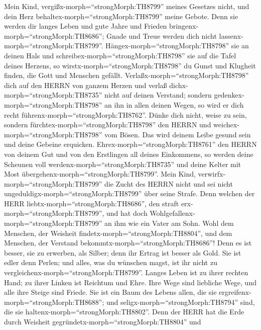  Mein Kind, vergißx-morph=``strongMorph:TH8799'' meines
Gesetzes nicht, und dein Herz behaltex-morph=``strongMorph:TH8799''
meine Gebote.  Denn sie werden dir langes Leben und gute
Jahre und Frieden bringenx-morph=``strongMorph:TH8686''; 
Gnade und Treue werden dich nicht lassenx-morph=``strongMorph:TH8799''.
Hängex-morph=``strongMorph:TH8798'' sie an deinen Hals und
schreibex-morph=``strongMorph:TH8798'' sie auf die Tafel deines Herzens,
 so wirstx-morph=``strongMorph:TH8798'' du Gunst und
Klugheit finden, die Gott und Menschen gefällt. 
Verlaßx-morph=``strongMorph:TH8798'' dich auf den HERRN von ganzem
Herzen und verlaß dichx-morph=``strongMorph:TH8735'' nicht auf deinen
Verstand;  sondern gedenkex-morph=``strongMorph:TH8798'' an
ihn in allen deinen Wegen, so wird er dich recht
führenx-morph=``strongMorph:TH8762''.  Dünke dich nicht,
weise zu sein, sondern fürchtex-morph=``strongMorph:TH8798'' den HERRN
und weichex-morph=``strongMorph:TH8798'' vom Bösen.  Das
wird deinem Leibe gesund sein und deine Gebeine erquicken. 
Ehrex-morph=``strongMorph:TH8761'' den HERRN von deinem Gut und von den
Erstlingen all deines Einkommens,  so werden deine Scheunen
voll werdenx-morph=``strongMorph:TH8735'' und deine Kelter mit Most
übergehenx-morph=``strongMorph:TH8799''.  Mein Kind,
verwirfx-morph=``strongMorph:TH8799'' die Zucht des HERRN nicht und sei
nicht ungeduldigx-morph=``strongMorph:TH8799'' über seine Strafe.
 Denn welchen der HERR liebtx-morph=``strongMorph:TH8686'',
den straft erx-morph=``strongMorph:TH8799'', und hat doch
Wohlgefallenx-morph=``strongMorph:TH8799'' an ihm wie ein Vater am Sohn.
 Wohl dem Menschen, der Weisheit
findetx-morph=``strongMorph:TH8804'', und dem Menschen, der Verstand
bekommtx-morph=``strongMorph:TH8686''!  Denn es ist besser,
sie zu erwerben, als Silber; denn ihr Ertrag ist besser als Gold.
 Sie ist edler denn Perlen; und alles, was du wünschen
magst, ist ihr nicht zu vergleichenx-morph=``strongMorph:TH8799''.
 Langes Leben ist zu ihrer rechten Hand; zu ihrer Linken
ist Reichtum und Ehre.  Ihre Wege sind liebliche Wege, und
alle ihre Steige sind Friede.  Sie ist ein Baum des Lebens
allen, die sie ergreifenx-morph=``strongMorph:TH8688''; und
seligx-morph=``strongMorph:TH8794'' sind, die sie
haltenx-morph=``strongMorph:TH8802''.  Denn der HERR hat
die Erde durch Weisheit gegründetx-morph=``strongMorph:TH8804'' und
